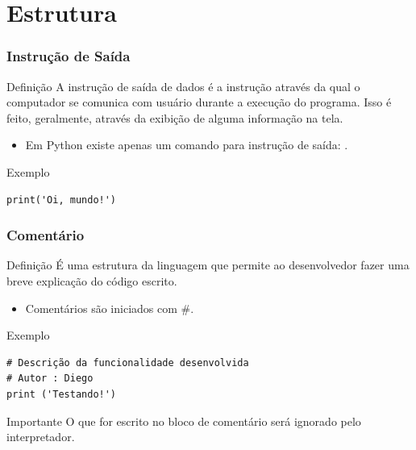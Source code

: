 \documentclass{beamer}
\begin{document}
\section{Estrutura}

\begin{frame}[fragile]
\frametitle{Instrução de Saída}

\begin{block}{Definição}
	A instrução de saída de dados é a instrução através da qual o computador se comunica com usuário durante a execução do programa. Isso é feito, geralmente, através da exibição de alguma informação na tela.
\end{block}\vfill

\begin{itemize}
	\item Em Python existe apenas um comando para instrução de saída: .
\end{itemize}\vfill

\begin{exampleblock}{Exemplo}
\begin{lstlisting}
print('Oi, mundo!')
\end{lstlisting}
\end{exampleblock}
\end{frame}

\begin{frame}[fragile]
\frametitle{Comentário}

\begin{block}{Definição}
É uma estrutura da linguagem que permite ao desenvolvedor fazer uma breve explicação do código escrito.
\end{block}\vfill

\begin{itemize}
	\item Comentários são iniciados com \#.
\end{itemize}\vfill

\begin{exampleblock}{Exemplo}
	\begin{lstlisting}
# Descrição da funcionalidade desenvolvida
# Autor : Diego
print ('Testando!')
	\end{lstlisting}
\end{exampleblock}\vfill

\begin{alertblock}{Importante}
O que for escrito no bloco de comentário será ignorado pelo interpretador.
\end{alertblock}
\end{frame}
\end{document}
